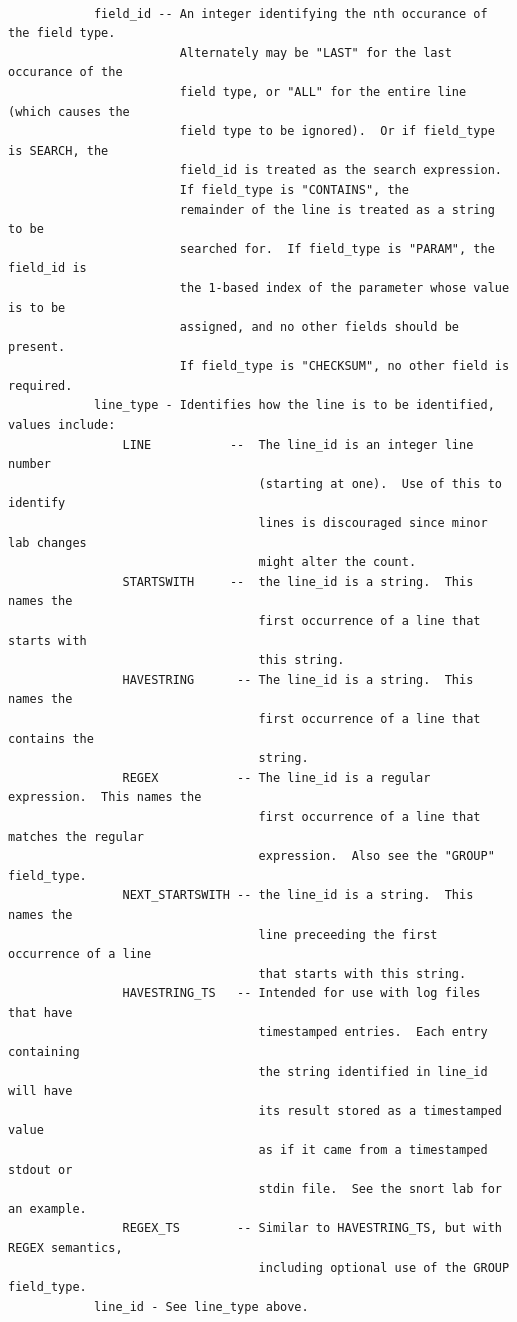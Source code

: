 \documentclass[12pt]{article}
\begin{document}
\begin{verbatim}
                              
            field_id -- An integer identifying the nth occurance of the field type.
                        Alternately may be "LAST" for the last occurance of the 
                        field type, or "ALL" for the entire line (which causes the 
                        field type to be ignored).  Or if field_type is SEARCH, the
                        field_id is treated as the search expression. 
                        If field_type is "CONTAINS", the 
                        remainder of the line is treated as a string to be 
                        searched for.  If field_type is "PARAM", the field_id is
                        the 1-based index of the parameter whose value is to be 
                        assigned, and no other fields should be present.
                        If field_type is "CHECKSUM", no other field is required.
            line_type - Identifies how the line is to be identified, values include:
                LINE           --  The line_id is an integer line number 
                                   (starting at one).  Use of this to identify 
                                   lines is discouraged since minor lab changes 
                                   might alter the count.
                STARTSWITH     --  the line_id is a string.  This names the 
                                   first occurrence of a line that starts with 
                                   this string. 
                HAVESTRING      -- The line_id is a string.  This names the 
                                   first occurrence of a line that contains the 
                                   string.
                REGEX           -- The line_id is a regular expression.  This names the 
                                   first occurrence of a line that matches the regular
                                   expression.  Also see the "GROUP" field_type.
                NEXT_STARTSWITH -- the line_id is a string.  This names the 
                                   line preceeding the first occurrence of a line 
                                   that starts with this string. 
                HAVESTRING_TS   -- Intended for use with log files that have 
                                   timestamped entries.  Each entry containing
                                   the string identified in line_id will have
                                   its result stored as a timestamped value
                                   as if it came from a timestamped stdout or 
                                   stdin file.  See the snort lab for an example.
                REGEX_TS        -- Similar to HAVESTRING_TS, but with REGEX semantics,
                                   including optional use of the GROUP field_type.
            line_id - See line_type above.
\end{verbatim}
\end{document}
